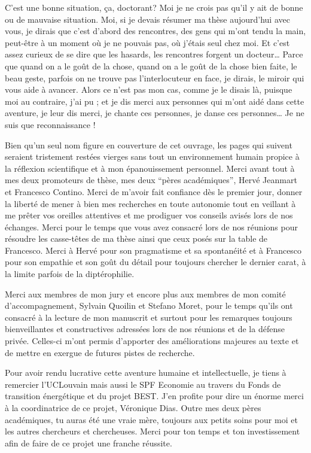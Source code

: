 
C’est une bonne situation, ça, doctorant? Moi je ne crois pas qu’il y ait de bonne ou de mauvaise situation. Moi, si je devais résumer ma thèse aujourd’hui avec vous, je dirais que c’est d’abord des rencontres, des gens qui m’ont tendu la main, peut-être à un moment où je ne pouvais pas, où j’étais seul chez moi. Et c’est assez curieux de se dire que les hasards, les rencontres forgent un docteur… Parce que quand on a le goût de la chose, quand on a le goût de la chose bien faite, le beau geste, parfois on ne trouve pas l’interlocuteur en face, je dirais, le miroir qui vous aide à avancer. Alors ce n’est pas mon cas, comme je le disais là, puisque moi au contraire, j’ai pu ; et je dis merci aux personnes qui m'ont aidé dans cette aventure, je leur dis merci, je chante ces personnes, je danse ces personnes… Je ne suis que reconnaissance ! 

Bien qu'un seul nom figure en couverture de cet ouvrage, les pages qui suivent seraient tristement restées vierges sans tout un environnement humain propice à la réflexion scientifique et à mon épanouissement personnel. Merci avant tout à mes deux promoteurs de thèse, mes deux ``pères académiques'', Hervé Jeanmart et Francesco Contino. Merci de m'avoir fait confiance dès le premier jour, donner la liberté de mener à bien mes recherches en toute autonomie tout en veillant à me prêter vos oreilles attentives et me prodiguer vos conseils avisés lors de nos échanges. Merci pour le temps que vous avez consacré lors de nos réunions pour résoudre les casse-têtes de ma thèse ainsi que ceux posés sur la table de Francesco. Merci à Hervé pour son pragmatisme et sa spontanéité et à Francesco pour son empathie et son goût du détail pour toujours chercher le dernier carat, à la limite parfois de la diptérophilie.

Merci aux membres de mon jury et encore plus aux membres de mon comité d'accompagnement, Sylvain Quoilin et Stefano Moret, pour le temps qu'ils ont consacré à la lecture de mon manuscrit et surtout pour les remarques toujours bienveillantes et constructives adressées lors de nos réunions et de la défense privée. Celles-ci m'ont permis d'apporter des améliorations majeures au texte et de mettre en exergue de futures pistes de recherche. 

Pour avoir rendu lucrative cette aventure humaine et intellectuelle, je tiens à remercier l'UCLouvain mais aussi le SPF Economie au travers du Fonds de transition énergétique et du projet BEST. J'en profite pour dire un énorme merci à la coordinatrice de ce projet, Véronique Dias. Outre mes deux pères académiques, tu auras été une vraie mère, toujours aux petits soins pour moi et les autres chercheurs et chercheuses. Merci pour ton temps et ton investissement afin de faire de ce projet une franche réussite.

